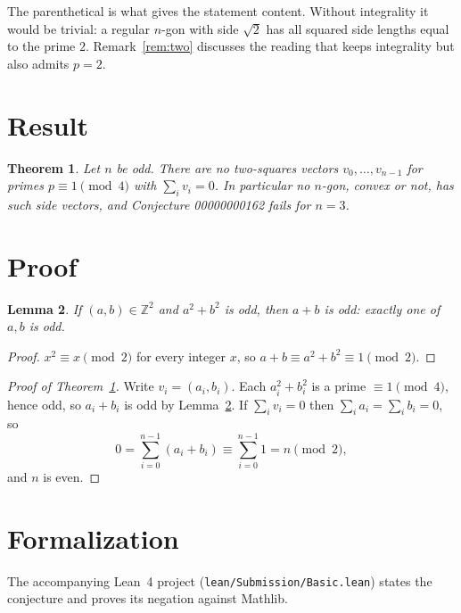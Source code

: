 \documentclass[11pt]{article}
\theoremstyle{plain}
\newtheorem{theorem}{Theorem}
\newtheorem{lemma}[theorem]{Lemma}
\theoremstyle{definition}
\theoremstyle{remark}
\begin{document}
The parenthetical is what gives the statement content. Without integrality
it would be trivial: a regular $n$-gon with side $\sqrt2$ has all squared side
lengths equal to the prime $2$. Remark~\ref{rem:two} discusses the reading
that keeps integrality but also admits $p=2$.

\section{Result}

\begin{theorem}\label{thm:main}
Let $n$ be odd. There are no two-squares vectors $v_0,\ldots,v_{n-1}$ for primes
$p\equiv1\pmod4$ with $\sum_iv_i=0$. In particular no $n$-gon, convex or not,
has such side vectors, and Conjecture 00000000162 fails for $n=3$.
\end{theorem}

\section{Proof}

\begin{lemma}\label{lem:onecoord}
If $(a,b)\in\mathbb Z^2$ and $a^2+b^2$ is odd, then $a+b$ is odd: exactly one
of $a,b$ is odd.
\end{lemma}

\begin{proof}
$x^2\equiv x\pmod2$ for every integer $x$, so $a+b\equiv a^2+b^2\equiv1\pmod 2$.
\end{proof}

\begin{proof}[Proof of Theorem~\ref{thm:main}]
Write $v_i=(a_i,b_i)$. Each $a_i^2+b_i^2$ is a prime $\equiv1\pmod4$, hence
odd, so $a_i+b_i$ is odd by Lemma~\ref{lem:onecoord}. If $\sum_iv_i=0$ then
$\sum_ia_i=\sum_ib_i=0$, so
\[
  0=\sum_{i=0}^{n-1}(a_i+b_i)\equiv\sum_{i=0}^{n-1}1=n\pmod 2,
\]
and $n$ is even.
\end{proof}

\section{Formalization}

The accompanying Lean~4 project (\texttt{lean/Submission/Basic.lean}) states
the conjecture and proves its negation against Mathlib.
\end{document}
